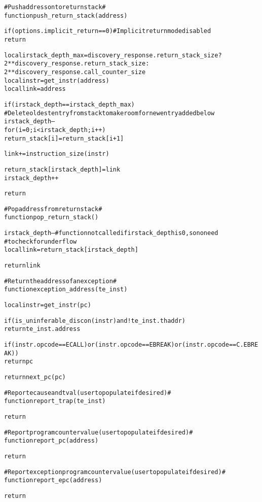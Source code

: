 \begin{alltt}
# Push address onto return stack #
function push_return_stack (address)

  if (options.implicit_return == 0) # Implicit return mode disabled
    return

  local irstack_depth_max = discovery_response.return_stack_size ?
                             2**discovery_response.return_stack_size :
                             2**discovery_response.call_counter_size
  local instr             = get_instr(address)
  local link              = address

  if (irstack_depth == irstack_depth_max)
    # Delete oldest entry from stack to make room for new entry added below
    irstack_depth--
    for (i = 0; i < irstack_depth; i++)
      return_stack[i] = return_stack[i+1]

  link += instruction_size(instr)

  return_stack[irstack_depth] = link
  irstack_depth++

  return

# Pop address from return stack #
function pop_return_stack ()

  irstack_depth-- # function not called if irstack_depth is 0, so no need
                  #  to check for underflow
  local  link = return_stack[irstack_depth]

  return link

# Return the address of an exception #
function exception_address(te_inst)

  local instr = get_instr(pc)

  if (is_uninferable_discon(instr) and !te_inst.thaddr)
    return te_inst.address

  if (instr.opcode == ECALL) or (instr.opcode == EBREAK) or (instr.opcode == C.EBREAK))
    return pc

  return next_pc(pc)
\end{alltt}

\pagebreak

\begin{alltt}
# Report ecause and tval (user to populate if desired) #
function report_trap(te_inst)

  return
  
# Report program counter value (user to populate if desired) #
function report_pc(address)

  return
  
# Report exception program counter value (user to populate if desired) #
function report_epc(address)

  return
  
\end{alltt}
